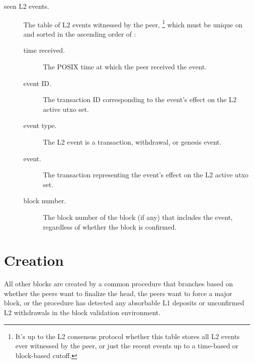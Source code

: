 \documentclass[../hydrozoa.tex]{subfiles}
\begin{document}
\begin{description}
  \item[seen L2 events.] The table of L2 events witnessed by the peer,%
    \footnote{It's up to the L2 consensus protocol whether this table stores all L2 events ever witnessed by the peer, or just the recent events up to a time-based or block-based cutoff.}
    which must be unique on  and sorted in the ascending order of :
    \begin{description}
      \item[time received.] The POSIX time at which the peer received the event.
      \item[event ID.] The transaction ID corresponding to the event's effect on the L2 active utxo set.
      \item[event type.] The L2 event is a transaction, withdrawal, or genesis event.
      \item[event.] The transaction representing the event's effect on the L2 active utxo set.
      \item[block number.] The block number of the block (if any) that includes the event, regardless of whether the block is confirmed.
    \end{description}
\end{description}

\section{Creation}%
\label{h:l2-block-creation}%

All other blocks are created by a common procedure that branches based on whether the peers want to finalize the head, the peers want to force a major block, or the procedure has detected any absorbable L1 deposits or unconfirmed L2 withdrawals in the block validation environment.
\end{document}
